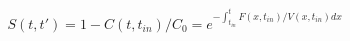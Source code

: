 \begin{equation}
S(t,t') = 1-C(t,t_{in})/C_0 = e^{-\int_{t_{in}}^t F(x,t_{in})/V(x,t_{in}) dx}
\end{equation}